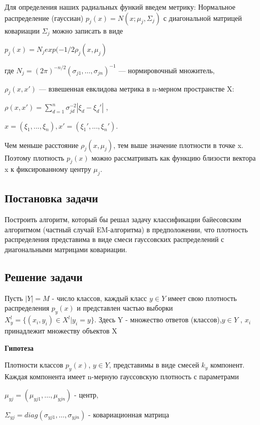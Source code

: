 Для определения наших радиальных функий введем метрику:
Нормальное распределение (гауссиан) $p_j(x) = N(x; \mu _j ,\Sigma _j)$ с диагональной матрицей ковариации $\Sigma _j$ можно записать в виде


$p_j(x) = N_j exp(-1/2 \rho  _j (x, \mu _j)$



где $N_j = (2\pi)^ {-n/2}(\sigma _{j1}, \dots ,\sigma _{jn})^{-1}$ — нормировочный множитель,

$\rho _j(x, x')$ — взвешенная евклидова метрика в n-мерном пространстве X:

$\rho (x, x') = \sum ^n _{d = 1} \sigma ^{-2} _{jd} |\xi _d - \xi _d '|$ ,

$x = (\xi _1, . . . ,\xi _n), x' = (\xi _1 ', . . . , \xi _n').$

Чем меньше расстояние $\rho_j(x, \mu _j)$, тем выше значение плотности в точке x. Поэтому плотность $p _j(x)$ можно рассматривать как функцию близости вектора x к фиксированному центру $\mu_j$.

\subsection*{Постановка задачи}

Построить алгоритм, который бы решал задачу классификации байесовским алгоритмом (частный случай EM-алгоритма) в предположении, что плотность распределения представима в виде смеси гауссовских распределений с диагональными матрицами ковариации.

\subsection*{Решение задачи}

Пусть  $|Y| = M$ - число классов, каждый класс $y \in Y$ имеет свою плотность распределения $p_y(x)$ и представлен частью выборки $X ^l _y = \{(x_i, y_i) \in X ^l | y_i = y \}.$
Здесь Y - множество ответов (классов),$y \in Y$ , $x_i$ принадлежит множеству объектов X

\textbf{Гипотеза}

Плотности классов $p_y(x)$, $y \in Y $, представимы в виде смесей $k_y$ компонент. Каждая компонента имеет n-мерную гауссовскую плотность с параметрами

$\mu _{yj} = (\mu _{yj1}, \dots , \mu _{yjn}) $ - центр,

$\Sigma _{yj} = diag(\sigma  _{yj1}, \dots , \sigma  _{yjn})$ - ковариационная матрица


